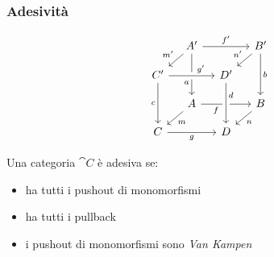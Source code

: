 \documentclass[8pt]{beamer}
\begin{document}
\begin{frame}[fragile]\frametitle{Adesività}


	\begin{wrapfigure}{ur}{0.4\textwidth}
                \[
                \begin{tikzcd}[row sep=11, column sep=11]
                        & {A'} && {B'} \\
                        {C'} && {D'} \\
                        & A && B \\
                        C && D
                        \arrow["{f'}", from=1-2, to=1-4]
                        \arrow["{m'}"', from=1-2, to=2-1]
                        \arrow["a"'{pos=0.7}, from=1-2, to=3-2]
                        \arrow["{n'}"', from=1-4, to=2-3]
                        \arrow["b", from=1-4, to=3-4]
                        \arrow["{g'}"{pos=0.7}, from=2-1, to=2-3, crossing over]
                        \arrow["c"', from=2-1, to=4-1]
                        \arrow["f"'{pos=0.3}, from=3-2, to=3-4]
                        \arrow["d"{pos=0.3}, from=2-3, to=4-3, crossing over]
                        \arrow["m", from=3-2, to=4-1]
                        \arrow["n", from=3-4, to=4-3]
                        \arrow["g"', from=4-1, to=4-3]
                    \end{tikzcd}
            \]
        \end{wrapfigure}
	Una categoria $\cat C$ è adesiva se:
	\begin{itemize}
		\item ha tutti i pushout di monomorfismi
		\item ha tutti i pullback
		\item i pushout di monomorfismi sono \emph{Van Kampen}
	\end{itemize}
\end{frame}
\end{document}

